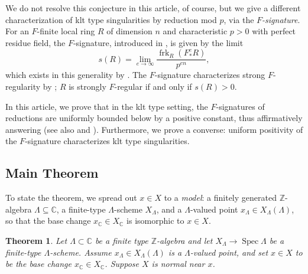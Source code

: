 \documentclass[11pt,leqno]{amsart}
\numberwithin{equation}{section}
\newtheorem{theorem}{Theorem}[section]
\theoremstyle{definition}
\theoremstyle{remark}
\renewcommand{\O}{\mathcal{O}}
\newcommand{\C}{\mathbb{C}}
\newcommand{\Z}{\mathbb{Z}}
\newcommand{\vare}{\varepsilon}
\newcommand{\Spec}{\operatorname{Spec}}
\begin{document}
We do not resolve this conjecture in this article, of course, but we give a different characterization of klt type singularities by reduction mod $p$, via the \textit{$F$-signature}. For an $F$-finite local ring $R$ of dimension $n$ and characteristic $p > 0$ with perfect residue field, the $F$-signature, introduced in \cite{ hl02}, is given by the limit  $$s(R) = \lim_{e \to \infty} \frac{\operatorname{frk}_R(F^e_* R)}{p^{en}},$$ which exists in this generality by \cite{tucker12}. The $F$-signature characterizes strong $F$-regularity by \cite{AL03}; $R$ is strongly $F$-regular if and only if $s(R) > 0$. 



In this article, we prove that in the klt type setting, the $F$-signatures of reductions are uniformly bounded below by a positive constant, thus affirmatively answering \cite[Question 5.9]{crst18} (see also \cite[Conjecture 1.1]{lp26} and \cite[Conjecture 1.2]{TY25}). Furthermore, we prove a converse: uniform positivity of the $F$-signature characterizes klt type singularities.

\subsection*{Main Theorem} To state the theorem, we spread out $x \in X$ to a \textit{model}: a finitely generated $\Z$-algebra $\Lambda \subseteq \C$, a finite-type $\Lambda$-scheme $X_\Lambda$, and a $\Lambda$-valued point $x_\Lambda \in X_\Lambda(\Lambda)$, so that the base change $x_\C \in X_\C$ is isomorphic to $x \in X$. 


\begin{theorem} \label{thm: main}
 Let $\Lambda \subset \C$ be a finite type $\Z$-algebra and let $X_\Lambda \to \Spec \Lambda$ be a finite-type $\Lambda$-scheme. Assume $x_\Lambda \in X_\Lambda(\Lambda)$ is a $\Lambda$-valued point, and set $x \in X$ to be the base change $x_\C \in X_\C$. Suppose $X$ is normal near $x$. 
\end{theorem}
\end{document}
